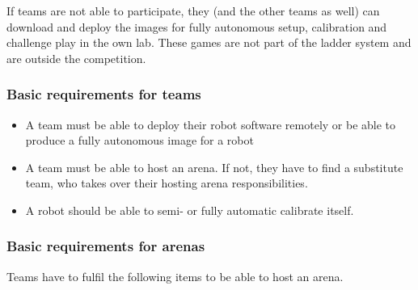 If teams are not able to participate, they (and the other teams as well) can download and deploy the images for fully autonomous setup, calibration and challenge play in the own lab. These games are not part of the ladder system and are outside the competition.

\subsubsection{Basic requirements for teams}
\label{sec:c3_BasicRequirementsForTeams}
\begin{itemize}
    \item A team must be able to deploy their robot software remotely or be able to produce a fully autonomous image for a robot
    \item A team must be able to host an arena. If not, they have to find a substitute team, who takes over their hosting arena responsibilities.
    \item A robot should be able to semi- or fully automatic calibrate itself.
\end{itemize}

\subsubsection{Basic requirements for arenas}
\label{sec:c3_BasicRequirementsForArenas}
Teams have to fulfil the following items to be able to host an arena.

